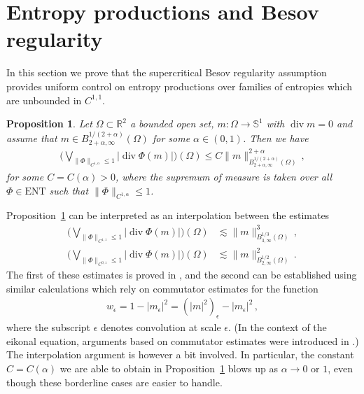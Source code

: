 \documentclass[fleqn
]{article}
\numberwithin{equation}{section}
\newcommand{\R}{{\mathbb R}}
\newcommand{\e}{\epsilon}
\DeclareMathOperator{\dv}{div}
\newtheorem{prop}[thm]{Proposition}
\theoremstyle{definition}
\begin{document}
 










\medskip
 

\section{Entropy productions and Besov regularity}\label{s:ent_prod}

In this section we prove that the supercritical Besov regularity assumption provides uniform control
 on entropy productions over families of entropies which 
are unbounded in $C^{1,1}$.




\begin{prop}\label{p:ent_prod}
Let $\Omega\subset\R^2$ a bounded open set,  $m\colon \Omega\to\mathbb S^1$ with $\dv m=0$ and assume that
 $m\in B^{  1/(2+\alpha)}_{2+\alpha,\infty}(\Omega)$ for some $\alpha\in (0,1)$.
 Then we have
 \begin{align*}
 \bigg(\bigvee_{\|\Phi\|_{C^{1,\alpha}} \leq 1} |\dv \Phi(m)|\bigg)(\Omega) \leq C \|m\|^{2+\alpha}_{B^{1/(2+\alpha)}_{2+\alpha,\infty}(\Omega)}\,,
 \end{align*}
 for some $C=C(\alpha)>0$, where the supremum of measure is taken over all $\Phi\in \mathrm{ENT}$ such that $\|\Phi\|_{C^{1,\alpha}} \leq 1$.
\end{prop}

Proposition~\ref{p:ent_prod} can be interpreted
 as an interpolation between the estimates
\begin{align*}
\bigg(
\bigvee_{\|\Phi\|_{C^{1,1}} \leq 1} |\dv \Phi(m)|\bigg)(\Omega) 
&
\lesssim
\|m\|^{3}_{B^{1/3}_{3,\infty}(\Omega)}\,,
\\
\bigg(\bigvee_{\|\Phi\|_{C^{0,1}} \leq 1} |\dv \Phi(m)|\bigg)(\Omega) &
\lesssim  \|m\|^{2}_{B^{1/2}_{2,\infty}(\Omega)}\,.
\end{align*}
The first of these estimates is proved in \cite[Proposition~3.10]{GL20},
and the second can be established using similar calculations
which rely on commutator estimates for the function
\begin{align*}
w_\e = 1-|m_\e|^2 =(|m|^2)_\e -|m_\e|^2\,,
\end{align*}
where the subscript $\e$ denotes convolution at scale $\e$.
(In the context of the eikonal equation, arguments based on commutator estimates were introduced in \cite{DeI}.)
The interpolation argument is however a bit involved.
In particular, the constant $C=C(\alpha)$ we are able to obtain in Proposition~\ref{p:ent_prod} blows up as $\alpha\to 0$ or $1$, even though these borderline cases are easier to handle.
\end{document}
